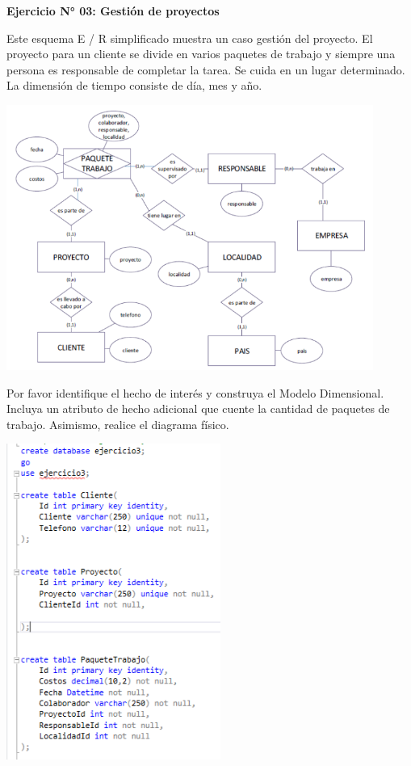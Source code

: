 \textbf{Ejercicio N° 03: Gestión de proyectos}
\item{Este esquema E / R simplificado muestra un caso gestión del proyecto.
El proyecto para un cliente se divide en varios paquetes de trabajo y siempre una persona es responsable de completar la tarea. Se cuida en un lugar determinado.
La dimensión de tiempo consiste de día, mes y año.}

\begin{center}
\includegraphics[width=12cm]{./Imagenes/3}
\end{center}
\item{Por favor identifique el hecho de interés y construya el Modelo Dimensional. Incluya un atributo de hecho adicional que cuente la cantidad de paquetes de trabajo. Asimismo, realice el diagrama físico.}

\begin{center}
\includegraphics[width=7cm]{./Imagenes/31}
\end{center}

